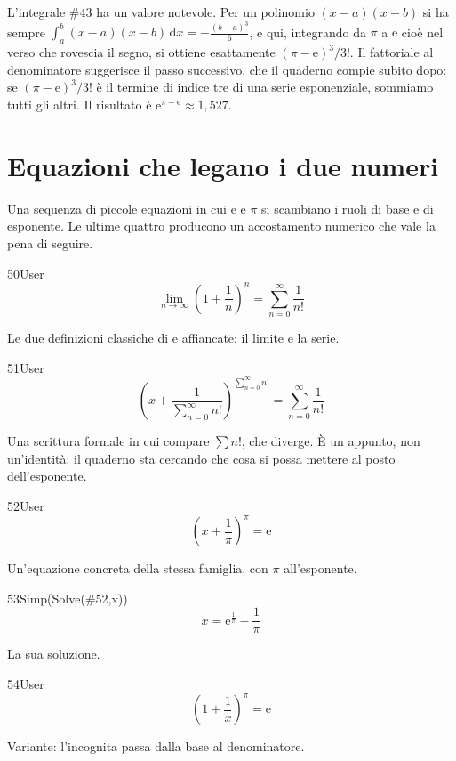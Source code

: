L'integrale $\#43$ ha un valore notevole. Per un polinomio $(x-a)(x-b)$ si ha sempre $\int_a^b (x-a)(x-b)\,\mathrm{d}x=-\tfrac{(b-a)^3}{6}$, e qui, integrando da $\pi$ a $\mathrm{e}$ cioè nel verso che rovescia il segno, si ottiene esattamente $(\pi-\mathrm{e})^3/3!$. Il fattoriale al denominatore suggerisce il passo successivo, che il quaderno compie subito dopo: se $(\pi-\mathrm{e})^3/3!$ è il termine di indice tre di una serie esponenziale, sommiamo tutti gli altri. Il risultato è $\mathrm{e}^{\pi-\mathrm{e}}\approx 1{,}527$.

\section{Equazioni che legano i due numeri}

Una sequenza di piccole equazioni in cui $\mathrm{e}$ e $\pi$ si scambiano i ruoli di base e di esponente. Le ultime quattro producono un accostamento numerico che vale la pena di seguire.

\begin{espr}{50}{User}{\verificata}
\[
\lim_{n \to \infty} \left(1 + \frac{1}{n}\right)^{n} = \sum_{n=0}^{\infty} \frac{1}{n!}
\]
\end{espr}
Le due definizioni classiche di $\mathrm{e}$ affiancate: il limite e la serie.

\begin{espr}{51}{User}{}
\[
\left(x + \frac{1}{\sum_{n=0}^{\infty} n!}\right)^{\sum_{n=0}^{\infty} n!} = \sum_{n=0}^{\infty} \frac{1}{n!}
\]
\end{espr}
Una scrittura formale in cui compare $\sum n!$, che diverge. È un appunto, non un'identità: il quaderno sta cercando che cosa si possa mettere al posto dell'esponente.

\begin{espr}{52}{User}{}
\[
\left(x + \frac{1}{\pi}\right)^{\pi} = \mathrm{e}
\]
\end{espr}
Un'equazione concreta della stessa famiglia, con $\pi$ all'esponente.

\begin{espr}{53}{Simp(Solve(\#52,x))}{}
\[
x = \mathrm{e}^{\frac{1}{\pi}} - \frac{1}{\pi}
\]
\end{espr}
La sua soluzione.

\begin{espr}{54}{User}{}
\[
\left(1 + \frac{1}{x}\right)^{\pi} = \mathrm{e}
\]
\end{espr}
Variante: l'incognita passa dalla base al denominatore.


